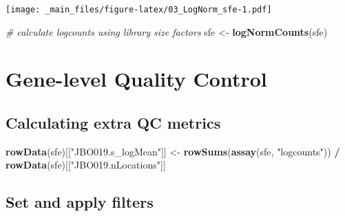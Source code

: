 \documentclass[
]{book}
\newenvironment{Shaded}{\begin{snugshade}}{\end{snugshade}}
\newcommand{\CommentTok}[1]{\textcolor[rgb]{0.56,0.35,0.01}{\textit{#1}}}
\newcommand{\DecValTok}[1]{\textcolor[rgb]{0.00,0.00,0.81}{#1}}
\newcommand{\FunctionTok}[1]{\textcolor[rgb]{0.13,0.29,0.53}{\textbf{#1}}}
\newcommand{\NormalTok}[1]{#1}
\newcommand{\OtherTok}[1]{\textcolor[rgb]{0.56,0.35,0.01}{#1}}
\newcommand{\SpecialCharTok}[1]{\textcolor[rgb]{0.81,0.36,0.00}{\textbf{#1}}}
\newcommand{\StringTok}[1]{\textcolor[rgb]{0.31,0.60,0.02}{#1}}
\begin{document}
\texttt{[image: \_main\_files/figure-latex/03\_LogNorm\_sfe-1.pdf]}

\begin{Shaded}
\begin{Highlighting}[]
\CommentTok{\# calculate logcounts using library size factors}
\NormalTok{sfe }\OtherTok{\textless{}{-}} \FunctionTok{logNormCounts}\NormalTok{(sfe)}
\end{Highlighting}
\end{Shaded}

\hypertarget{gene-level-quality-control}{%
\section{Gene-level Quality Control}\label{gene-level-quality-control}}

\hypertarget{calculating-extra-qc-metrics}{%
\subsection{Calculating extra QC metrics}\label{calculating-extra-qc-metrics}}

\begin{Shaded}
\begin{Highlighting}[]
\FunctionTok{rowData}\NormalTok{(sfe)[[}\StringTok{"JBO019.s\_logMean"}\NormalTok{]] }\OtherTok{\textless{}{-}} \FunctionTok{rowSums}\NormalTok{(}\FunctionTok{assay}\NormalTok{(sfe, }\StringTok{"logcounts"}\NormalTok{)) }\SpecialCharTok{/} \FunctionTok{rowData}\NormalTok{(sfe)[[}\StringTok{"JBO019.nLocations"}\NormalTok{]]}
\end{Highlighting}
\end{Shaded}

\hypertarget{set-and-apply-filters}{%
\subsection{Set and apply filters}\label{set-and-apply-filters}}

\begin{Shaded}
\end{Shaded}
\end{document}
